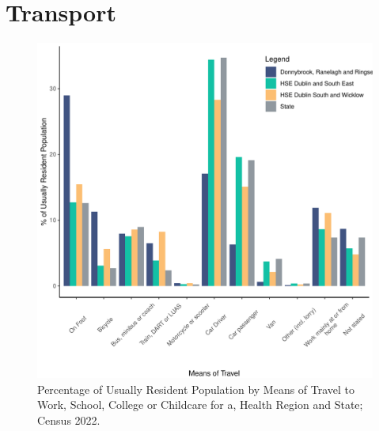 \documentclass{article}
\begin{document}
\section{Transport}\label{sect:Trans}
\begin{figure}[H]
	\centering
	\includegraphics[width = 120mm]{../figures/TravelED.pdf}
	\caption{Percentage of Usually Resident Population by Means of Travel to Work, School, College or Childcare for a, Health Region and State; Census 2022.}
	\label{fig:vbnv}
	\end{figure}
\end{document}
